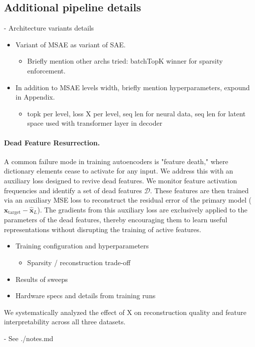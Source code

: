 \subsection{Additional pipeline details}
\label{subsection:additional_pipeline_details}

- Architecture variants details

\begin{itemize}
    
    \item Variant of MSAE as variant of SAE.
    \begin{itemize}
        \item Briefly mention other archs tried: batchTopK winner for sparsity enforcement.
    \end{itemize}
    
    \item In addition to MSAE levels width, briefly mention hyperparameters, expound in Appendix.
    \begin{itemize}
        \item topk per level, loss X per level, seq len for neural data, seq len for latent space used with transformer layer in decoder
    \end{itemize}

\end{itemize}

\paragraph{Dead Feature Resurrection.}
A common failure mode in training autoencoders is "feature death," where dictionary elements cease to activate for any input. We address this with an auxiliary loss designed to revive dead features. We monitor feature activation frequencies and identify a set of dead features $\mathcal{D}$. These features are then trained via an auxiliary MSE loss to reconstruct the residual error of the primary model ($\mathbf{x}_{\text{target}} - \hat{\mathbf{x}}_L$). The gradients from this auxiliary loss are exclusively applied to the parameters of the dead features, thereby encouraging them to learn useful representations without disrupting the training of active features.

\begin{itemize}
    \item Training configuration and hyperparameters
    \begin{itemize}
        \item Sparsity / reconstruction trade-off
    \end{itemize}
    \item Results of sweeps
    \item Hardware specs and details from training runs
\end{itemize}

We systematically analyzed the effect of X on reconstruction quality and feature interpretability across all three datasets.

- See ./notes.md